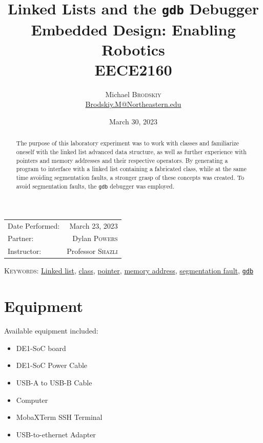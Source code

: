 \documentclass[
	letterpaper, %
	10pt, %
]{CSUniSchoolLabReport}
\title{Linked Lists and the \texttt{gdb} Debugger\\ Embedded Design: Enabling Robotics \\ EECE2160} %
\author{Michael \textsc{Brodskiy}\\ \small \href{mailto:Brodskiy.M@Northeastern.edu}{Brodskiy.M@Northeastern.edu}}
\date{March 30, 2023} %
\begin{document}
\maketitle %

\begin{center}
	\begin{tabular}{l r}
		Date Performed: & March 23, 2023 \\ %
        Partner: & Dylan \textsc{Powers} \\ %
		Instructor: & Professor \textsc{Shazli} %
	\end{tabular}
\end{center}

\newpage

\begin{abstract}

  The purpose of this laboratory experiment was to work with classes and familiarize oneself with the linked list advanced data structure, as well as further experience with pointers and memory addresses and their respective operators. By generating a program to interface with a linked list containing a fabricated class, while at the same time avoiding segmentation faults, a stronger grasp of these concepts was created. To avoid segmentation faults, the \texttt{gdb} debugger was employed.

\end{abstract}

\begin{flushleft}

  \textsc{Keywords:} \underline{Linked list}, \underline{class}, \underline{pointer}, \underline{memory address}, \underline{segmentation fault}, \underline{\texttt{gdb}}

\end{flushleft}

\newpage

\section{Equipment}

\hspace{.5 in} Available equipment included:\\

\begin{itemize}

  \item DE1-SoC board

  \item DE1-SoC Power Cable

  \item USB-A to USB-B Cable

  \item Computer

  \item MobaXTerm SSH Terminal

  \item USB-to-ethernet Adapter

\end{itemize}
\end{document}
